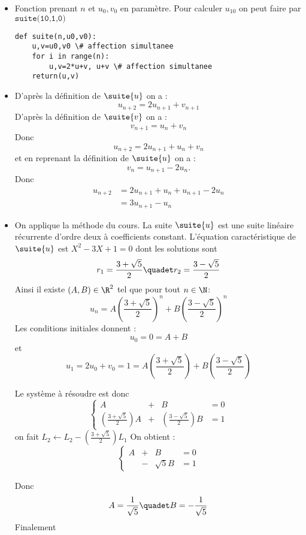 \documentclass[a4paper, 11pt,reqno]{article}
\begin{document}
\begin{correction}
\begin{itemize}
\item Fonction prenant $n$ et $u_0, v_0 $ en paramètre. Pour calculer $u_10$ on peut faire par $\texttt{suite(10,1,0)}$ 
\begin{lstlisting}
def suite(n,u0,v0):
    u,v=u0,v0 \# affection simultanee
    for i in range(n):
        u,v=2*u+v, u+v \# affection simultanee
    return(u,v)
\end{lstlisting}

\item D'après la définition de $\suite{u}$ on a :
$$u_{n+2} = 2u_{n+1}+v_{n+1}$$
D'après la définition de $\suite{v}$ on a :
$$v_{n+1} = u_n +v_n$$
Donc 
$$u_{n+2} = 2u_{n+1}+ u_n +v_n$$
et en reprenant la définition de $\suite{u}$ on a :
$$v_n = u_{n+1}-2u_n.$$
Donc 
\begin{align*}
u_{n+2}& = 2u_{n+1}+ u_n +u_{n+1}-2u_n\\
			&= 3u_{n+1}- u_n
\end{align*}
\item On applique la méthode du cours. La suite $\suite{u}$ est une suite linéaire récurrente d'ordre deux à coefficients constant. L'équation caractéristique de $\suite{u}$ est 
$X^2-3X+1=0$ dont les solutions sont 
$$r_1 = \frac{3+\sqrt{5}}{2} \quadet r_2 =\frac{3-\sqrt{5}}{2}$$
Ainsi il existe $(A,B)\in \R^2$ tel que pour tout $n\in\N$:
$$u_n = A \left(\frac{3+\sqrt{5}}{2} \right)^n+B\left(\frac{3-\sqrt{5}}{2} \right)^n$$
Les conditions initiales donnent : 
$$u_ 0  = 0=A+B$$
et 
$$u_1 = 2u_0+v_0= 1=  A \left(\frac{3+\sqrt{5}}{2} \right)+B\left(\frac{3-\sqrt{5}}{2} \right)$$

Le système à résoudre est donc 
$$\left\{\begin{array}{cccc}
A&+&B&=0\\
 \left(\frac{3+\sqrt{5}}{2} \right)A&+&\left(\frac{3-\sqrt{5}}{2} \right)B&=1
\end{array}\right.$$
on fait $L_2\leftarrow L_2- \left(\frac{3+\sqrt{5}}{2} \right)L_1$ On obtient : 
$$\left\{\begin{array}{cccc}
A&+&B&=0\\
 & -&\sqrt{5}B&=1
\end{array}\right.$$

Donc $$A=\frac{1}{\sqrt{5}} \quadet B=-\frac{1}{\sqrt{5}}$$
Finalement 

\end{itemize}

\end{correction}
\end{document}
